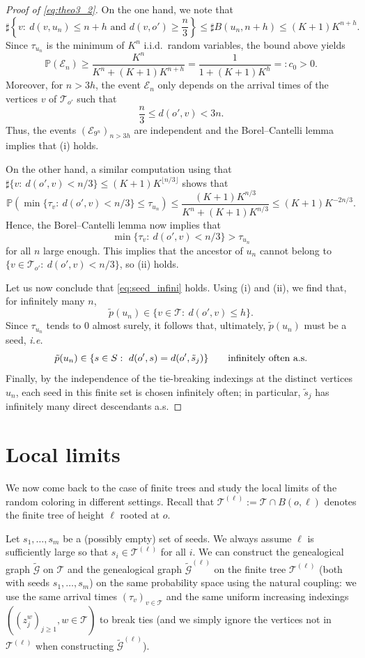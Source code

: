 \documentclass[french]{article}
\newcommand{\zi}{z}
\renewcommand{\P}{\mathbb{P}}
\newcommand{\T}{\mathcal{T}}
\renewcommand{\1}{\mathds{1}}
\begin{document}
\begin{proof}[Proof of \eqref{eq:theo3_2}]
On the one hand, we note that
$$
\sharp\left\{v:\ d(v,u_n)\le n+h \text{ and } d(v,o')\ge \frac{n}{3}\right\}
\le \sharp B(u_n,n+h)
\le (K+1)K^{n+h}.
$$
Since $\tau_{u_n}$ is the minimum of $K^n$ i.i.d.\ random variables, the bound above yields
$$
\P(\mathcal{E}_n) \ge \frac{K^n}{K^n+(K+1)K^{n+h}} = \frac{1}{1+(K+1)K^h} =:c_0>0.
$$
Moreover, for $n>3h$, the event $\mathcal{E}_n$ only depends on the arrival times of the vertices $v$ of $\T_{o'}$ such that
$$
\frac{n}{3}\le d(o',v)<3n.
$$
Thus, the events $(\mathcal{E}_{9^n})_{n>3h}$ are independent and the Borel--Cantelli lemma implies that (i) holds.

On the other hand, a similar computation using that $\sharp\{v:\ d(o',v)<n/3\} \le (K+1)K^{\lfloor n/3 \rfloor}$ shows that
$$
\P\left(\min \{\tau_v:\ d(o',v)<n/3\}\le \tau_{u_n}\right)
\le
\frac{(K+1)K^{n/3}}{K^n+(K+1)K^{n/3}}
\le
(K+1)K^{-2n/3}.
$$
Hence, the Borel--Cantelli lemma now implies that
$$
\min \{\tau_v:\ d(o',v)<n/3\}>\tau_{u_n}
$$
for all $n$ large enough. This implies that the ancestor of $u_n$ cannot belong to $\{v\in \T_{o'}:\ d(o',v)<n/3\}$, so (ii) holds. 

Let us now conclude that \eqref{eq:seed_infini} holds.
Using (i) and (ii), we find that, for infinitely many $n$,
$$
\tilde{p}(u_n)\in \{v\in \T:\ d(o',v)\le h\}.
$$
Since $\tau_{u_n}$ tends to $0$ almost surely, it follows that, ultimately, 
$\tilde{p}(u_n)$ must be a seed, \emph{i.e.}
$$
\tilde{p}(u_n)\in \{s\in S:\ d(o',s)=d(o',\tilde{s}_j)\}\qquad\hbox{infinitely often a.s.}
$$
Finally, by the independence of the tie-breaking indexings at the distinct vertices $u_n$, each seed in this finite set is chosen infinitely often; in particular, $\tilde{s}_j$ has infinitely many direct descendants a.s.
\end{proof}


\section{Local limits}\label{s:local_limits}


We now come back to the case of finite trees and study the local limits of the random coloring in different settings. Recall that $\T^{(\ell)} := \T \cap B(o,\ell)$ denotes the finite tree of height $\ell$ rooted at $o$.
\medskip

Let $s_1,\ldots, s_m$ be a (possibly empty) set of seeds. We always assume $\ell$ is sufficiently large so that $s_i \in \T^{(\ell)}$ for all $i$. We can construct the genealogical graph $\tilde{\mathcal{G}}$ on $\T$ and the genealogical graph $\tilde{\mathcal{G}}^{(\ell)}$ on the finite tree $\T^{(\ell)}$ (both with seeds $s_1,\ldots, s_m$) on the same probability space using the natural coupling: we use the same arrival times $(\tau_v)_{v\in \T}$ and the same uniform increasing indexings $((\zi_j^w)_{j\ge 1}, w\in \T)$ to break ties (and we simply ignore the vertices not in $\T^{(\ell)}$ when constructing $\tilde{\mathcal{G}}^{(\ell)}$).
\medskip
\end{document}
